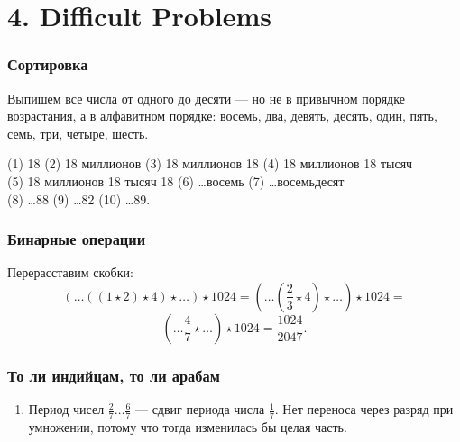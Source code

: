 \section[Самые сложные задачи]{4. Difficult Problems}

\begin{frame} \frametitle{Сортировка}

Выпишем все числа от одного до десяти — но не в привычном порядке возрастания, а в алфавитном порядке: восемь, два, девять, десять, один, пять, семь, три, четыре, шесть. \medskip


(1) 18 (2) 18 миллионов (3) 18 миллионов 18 (4) 18 миллионов 18 тысяч \\
(5) 18 миллионов 18 тысяч 18 (6) \ldots восемь (7) \ldots восемьдесят \\
(8) \ldots 88 (9) \ldots 82 (10) \ldots 89.

\end{frame}

\begin{frame} \frametitle{Бинарные операции}
Перерасставим скобки: \vspace{-3mm}
	\[ (\ldots((1\star2)\star4)\star\ldots)\star1024 = \left(\ldots\left(\frac{2}{3}\star4\right)\star\ldots\right)\star1024 =\] \vspace{-3mm}
	\[ \left(\ldots\frac{4}{7}\star\ldots\right)\star1024 = \frac{1024}{2047}.\]
\end{frame}

\begin{frame} \frametitle{То ли индийцам, то ли арабам}



\begin{enumerate}
	\item Период чисел $\frac27 \ldots \frac67$ — сдвиг периода числа $\frac17$.
	\mitem Нет переноса через разряд при умножении, потому что тогда изменилась бы целая часть.
\end{enumerate}

\end{frame}
